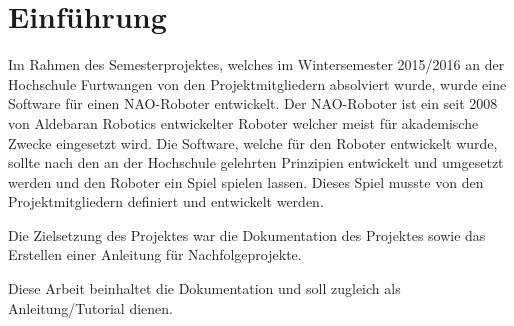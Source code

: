 \chapter{Einführung}

    Im Rahmen des Semesterprojektes, welches im Wintersemester 2015/2016 an der
    Hochschule Furtwangen von den Projektmitgliedern absolviert wurde, wurde
    eine Software für einen NAO-Roboter entwickelt.
    Der NAO-Roboter ist ein seit 2008 von Aldebaran Robotics entwickelter
    Roboter welcher meist für akademische Zwecke eingesetzt wird.
    Die Software, welche für den Roboter entwickelt wurde, sollte nach den an
    der Hochschule gelehrten Prinzipien entwickelt und umgesetzt werden und den
    Roboter ein Spiel spielen lassen.
    Dieses Spiel musste von den Projektmitgliedern definiert und entwickelt
    werden.

    Die Zielsetzung des Projektes war die Dokumentation des Projektes sowie das
    Erstellen einer Anleitung für Nachfolgeprojekte.

    Diese Arbeit beinhaltet die Dokumentation und soll zugleich als
    Anleitung/Tutorial dienen.

